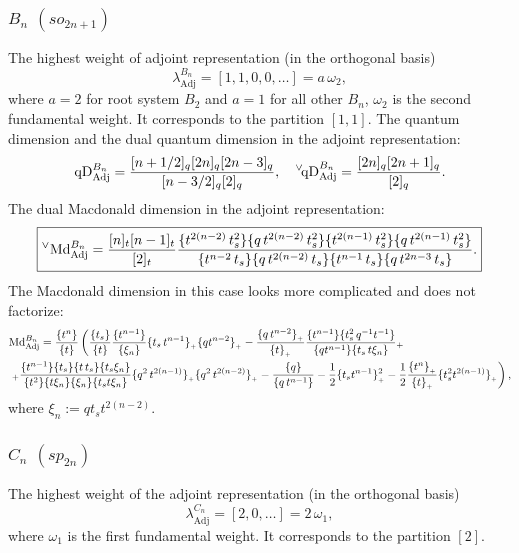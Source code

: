 \documentclass{article}
\def\nn{\nonumber}
\def\MD{\hbox{Md}}%
\def\qDv{{^\vee\!\hbox{qD}}}
\def\qD{\hbox{qD}}
\def\MD{\hbox{Md}}%
\def\qDv{{^\vee\!\hbox{qD}}}
\def\qD{\hbox{qD}}
\def\Adj{\text{Adj}}
\def\nn{\nonumber}
\begin{document}
\subsubsection{$B_n$ $(so_{2n+1})$}
The highest weight of adjoint representation (in the orthogonal basis)
\begin{equation}
    \lambda_{\Adj}^{B_n} = [1,1,0,0,\dots] = a \, \omega_2,
\end{equation}
where $a = 2$ for root system $B_2$ and $a = 1$ for all other $B_n$, $\omega_2$ is the second fundamental weight. It corresponds to the partition $[1,1]$.
\noindent
The quantum dimension and the dual quantum dimension in the adjoint representation:
\begin{equation}
    \qD_{\Adj}^{B_n} = \frac{[n+1/2]_q [2n]_q [2n-3]_q}{[n-3/2]_q[2]_q}, \quad  \qDv_{\Adj}^{B_n}  = \frac{[2n]_q[2n+1]_q}{[2]_q}.
\end{equation}
The dual Macdonald dimension in the adjoint representation:
\begin{equation}
\boxed{
    ^{\vee}\MD_{\Adj}^{B_n}=
    \frac{[n]_t[n-1]_t}{[2]_t}
    \frac{\{t^{2(n-2)}\,t_s^2\}\{q\,t^{2(n-2)}\,t_s^2\} \{t^{2(n-1)}\,t_s^2\} \{q\,t^{2(n-1)}\,t_s^2\} }{\{t^{n-2}\,t_s\}\{q\,t^{2(n-2)}\,t_s\}\{t^{n-1}\,t_s\}\{q\,t^{2n-3}\,t_s\}}.}
\end{equation}
The Macdonald dimension in this case looks more complicated and does not factorize:
\begin{equation}
    \begin{aligned}
&\MD_{\Adj}^{B_n}
= {\{t^n\}\over\{t\}}\left({\{t_s\}\over \{t\}}{\{t^{n-1}\}\over\{\xi_n\}} \{t_s\,t^{n-1}\}_{_+}\{q t^{n-2}\}_{_+}- {\{q\,t^{n-2}\}_{_+}\over\{t\}_{_+}} \frac{\{t^{n-1}\}\{t_s^2\,q^{-1}t^{-1}\}}{\{qt^{n-1}\}\{t_s\,t\xi_n\}}{_+}\right. \nn\\
&\left.{_+} \frac{\{t^{n-1}\}\{t_s\}\{t\,t_s\}\{t_s \xi_n\}}{\{t^2\}\{t\xi_n\}\{\xi_n\}\{t_st\xi_n\}}
\{q^2\,t^{2(n-1)}\}_{_+}\{q^2\,t^{2(n-2)}\}_{_+} - \frac{\{q\}}{\{q\,t^{n-1}\}}
-\frac{1}{2}\{t_s t^{n-1}\}_{_+}^2 -\frac{1}{2} \frac{\{t^n\}_{_+}}{\{t\}_{_+}} \{t_s^2 t^{2(n-1)}\}_{_+}\right),
     \label{cadjnonf}
    \end{aligned}
\end{equation}
where $\xi_n:=qt_st^{2(n-2)}$.

\subsubsection{$C_n $ $ (sp_{2n})$}
The highest weight of the adjoint representation (in the orthogonal basis)
\begin{equation}
    \lambda_{\Adj}^{C_n} = [2,0,\dots] = 2 \, \omega_1,
\end{equation}
where $\omega_1$ is the first fundamental weight.
It corresponds to the partition $[2]$.
\end{document}
